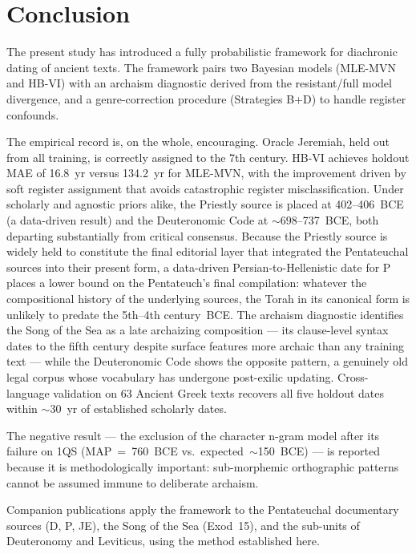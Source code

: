 \documentclass[10pt,letterpaper]{article}
\newcommand{\mvn}{MLE-MVN}
\newcommand{\hbvi}{HB-VI}
\begin{document}
\section*{Conclusion}

The present study has introduced a fully probabilistic framework for
diachronic dating of ancient texts.  The framework pairs two Bayesian
models (\mvn{} and \hbvi{}) with an archaism diagnostic derived from the
resistant/full model divergence, and a genre-correction procedure
(Strategies B+D) to handle register confounds.

The empirical record is, on the whole, encouraging.  Oracle Jeremiah,
held out from all training, is correctly assigned to the 7th century.
\hbvi{} achieves holdout MAE of 16.8~yr versus 134.2~yr for \mvn{}, with
the improvement driven by soft register assignment that avoids catastrophic
register misclassification.  Under scholarly and agnostic priors alike, the Priestly source
is placed at 402--406~BCE (a data-driven result) and the Deuteronomic
Code at $\sim$698--737~BCE, both departing substantially from critical
consensus.  Because the Priestly source is widely held to constitute the
final editorial layer that integrated the Pentateuchal sources into their
present form, a data-driven Persian-to-Hellenistic date for P places a
lower bound on the Pentateuch's final compilation: whatever the
compositional history of the underlying sources, the Torah in its
canonical form is unlikely to predate the 5th--4th century~BCE.  The archaism diagnostic identifies the Song of the Sea as a
late archaizing composition --- its clause-level syntax dates to the fifth
century despite surface features more archaic than any training text ---
while the Deuteronomic Code shows the opposite pattern, a genuinely old
legal corpus whose vocabulary has undergone post-exilic updating.
Cross-language validation on 63 Ancient Greek texts recovers all five
holdout dates within $\sim$30~yr of established scholarly dates.

The negative result --- the exclusion of the character n-gram model
after its failure on 1QS (MAP~=~760~BCE vs.\ expected~$\sim$150~BCE) ---
is reported because it is methodologically important: sub-morphemic
orthographic patterns cannot be assumed immune to deliberate archaism.

Companion publications apply the framework to the Pentateuchal documentary
sources (D, P, JE), the Song of the Sea (Exod~15), and the sub-units of
Deuteronomy and Leviticus, using the method established here.
\end{document}

